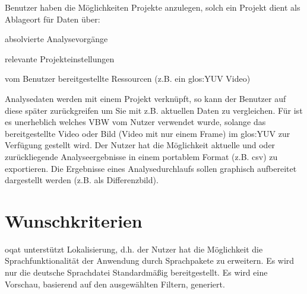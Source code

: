  Benutzer haben die Möglichkeiten Projekte anzulegen, solch ein Projekt dient als Ablageort für Daten über:
\begin{compactitem}
\item absolvierte Analysevorgänge
\item relevante Projekteinstellungen
\item vom Benutzer bereitgestellte Ressourcen (z.B. ein \gls{glos:YUV} Video)
\end{compactitem}
 	Analysedaten werden mit einem Projekt verknüpft, so kann der Benutzer auf diese später zurückgreifen um Sie mit z.B. aktuellen Daten zu vergleichen.
 Für \projektTitel ist es unerheblich welches \gls{VBW} vom Nutzer verwendet wurde, solange das bereitgestellte Video oder Bild (Video mit nur einem Frame) im \gls{glos:YUV} zur Verfügung gestellt wird.
 Der Nutzer hat die Möglichkeit aktuelle und oder zurückliegende Analyseergebnisse in einem portablem Format (z.B. \gls{csv}) zu exportieren.
 Die Ergebnisse eines Analysedurchlaufs sollen graphisch aufbereitet dargestellt werden (z.B. als Differenzbild).

\section{Wunschkriterien}
\setcounter{counterKriterien}{0}
 \gls{oqat} unterstützt Lokalisierung, d.h. der Nutzer hat die Möglichkeit die Sprachfunktionalität der Anwendung durch Sprachpakete zu erweitern. Es wird nur die deutsche Sprachdatei Standardmäßig bereitgestellt.
 Es wird eine Vorschau, basierend auf den ausgewählten Filtern, generiert.

